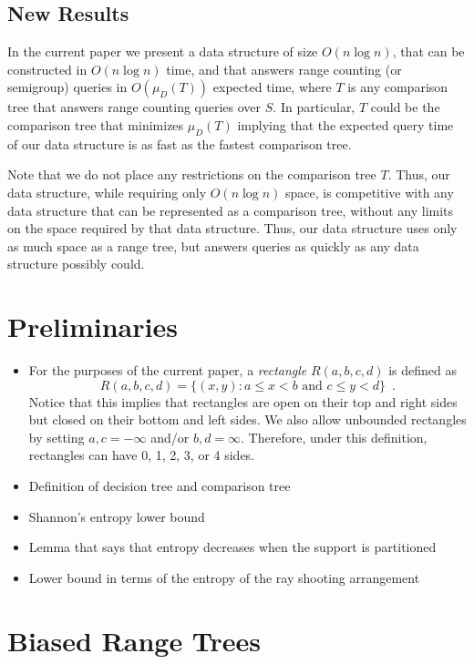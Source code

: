 \documentclass[lotsofwhite,charterfonts]{patmorin}
\begin{document}
\subsection{New Results}

In the current paper we present a data structure of size $O(n\log n)$,
that can be constructed in $O(n\log n)$ time, and that answers range
counting (or semigroup) queries in $O(\mu_D(T))$ expected time, where
$T$ is any comparison tree that answers range counting queries over $S$.
In particular, $T$ could be the comparison tree that minimizes
$\mu_D(T)$ implying that the expected query time of our data structure
is as fast as the fastest comparison tree.

Note that we do not place any restrictions on the comparison tree $T$.
Thus, our data structure, while requiring only $O(n\log n)$ space, is
competitive with any data structure that can be represented as a
comparison tree, without any limits on the space required by that data
structure.  Thus, our data structure uses only as much space as a
range tree, but answers queries as quickly as any data structure
possibly could.

\section{Preliminaries}

\begin{itemize}
\item For the purposes of the current paper, a \emph{rectangle} 
$R(a,b,c,d)$ is defined as
\[
    R(a,b,c,d) = \{ (x,y) : \mbox{$a\le x < b$ and $c \le y < d$}\}
	\enspace .
\]
Notice that this implies that rectangles are open on their top and
right sides but closed on their bottom and left sides.  We also allow
unbounded rectangles by setting $a,c=-\infty$ and/or $b,d=\infty$.
Therefore, under this definition, rectangles can have 0, 1, 2, 3,
or 4
sides.

\item Definition of decision tree and comparison tree
\item Shannon's entropy lower bound
\item Lemma that says that entropy decreases when the support is
partitioned
\item Lower bound in terms of the entropy of the ray shooting
arrangement
\end{itemize}

\section{Biased Range Trees}
\end{document}
